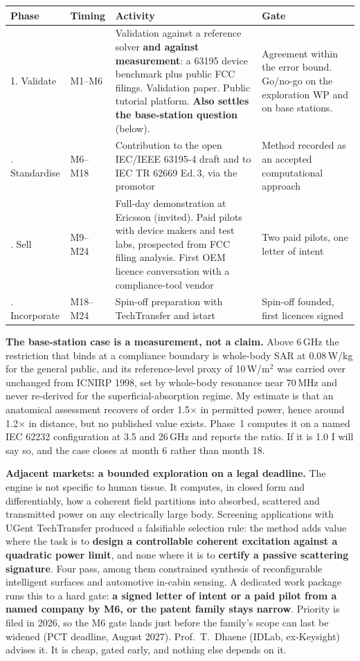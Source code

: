 \documentclass[10pt,a4paper]{article}
\begin{document}
\begin{center}\small
\begin{tabular}{@{}llp{5.9cm}p{4.0cm}@{}}
\toprule
Phase & Timing & Activity & Gate \\
\midrule
1. Validate & M1--M6 & Validation against a reference solver \textbf{and against measurement}: a 63195 device benchmark plus
public FCC filings. Validation paper. Public tutorial platform. \textbf{Also settles the base-station question} (below). &
Agreement within the error bound. Go/no-go on the exploration WP and on base stations. \\
\addlinespace
2. Standardise & M6--M18 & Contribution to the open IEC/IEEE 63195-4 draft and to IEC TR 62669 Ed.\,3, via the promotor & Method
recorded as an accepted computational approach \\
\addlinespace
3. Sell & M9--M24 & Full-day demonstration at Ericsson (invited). Paid pilots with device makers and test labs, prospected from FCC
filing analysis. First OEM licence
conversation with a compliance-tool vendor & Two paid pilots, one letter of intent \\
\addlinespace
4. Incorporate & M18--M24 & Spin-off preparation with TechTransfer and istart & Spin-off founded, first licences signed \\
\bottomrule
\end{tabular}
\end{center}

\textbf{The base-station case is a measurement, not a claim.} Above 6\,GHz the restriction that binds at a compliance boundary is
whole-body SAR at 0.08\,W/kg for the general public, and its reference-level proxy of 10\,W/m$^2$ was carried over unchanged from ICNIRP 1998,
set by whole-body resonance near 70\,MHz and never re-derived for the superficial-absorption regime. My estimate is that an anatomical assessment recovers of order 1.5$\times$ in permitted power, hence around 1.2$\times$ in distance, but no
published value exists. Phase~1 computes it on a named IEC 62232 configuration at 3.5 and
26\,GHz and reports the ratio. If it is 1.0 I will say so, and the case closes at month 6 rather than month 18.

\textbf{Adjacent markets: a bounded exploration on a legal deadline.} The engine is not specific to human tissue. It computes, in
closed form and differentiably, how a coherent field partitions into absorbed, scattered and transmitted power on any electrically large
body. Screening applications with UGent TechTransfer produced a falsifiable selection rule: the method adds value where the task is
to \textbf{design a controllable coherent excitation against a quadratic power limit}, and none where it is to \textbf{certify a passive scattering
signature}. Four pass, among them constrained synthesis of reconfigurable intelligent surfaces and automotive in-cabin sensing. A dedicated
work package runs this to a hard gate: \textbf{a signed letter of intent or a paid pilot from a named company
by M6, or the patent family stays narrow}. Priority is filed in 2026, so the M6 gate lands just before the family's scope can last be widened (PCT
deadline, August 2027). Prof.~T.~Dhaene (IDLab, ex-Keysight) advises it. It is
cheap, gated early, and nothing else depends on it.
\end{document}
